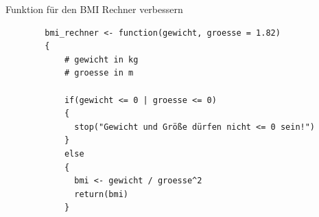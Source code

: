 \documentclass[xcolor=dvipsnames, aspectratio = 169]{beamer}
\begin{document}
\begin{frame}[fragile]{Funktion für den BMI Rechner verbessern}
        \begin{verbatim}
        bmi_rechner <- function(gewicht, groesse = 1.82) 
        {
            # gewicht in kg
            # groesse in m
            
            if(gewicht <= 0 | groesse <= 0)
            {
              stop("Gewicht und Größe dürfen nicht <= 0 sein!")
            }
            else
            {
              bmi <- gewicht / groesse^2
              return(bmi)
            }
    \end{verbatim}
\end{frame}
\end{document}
